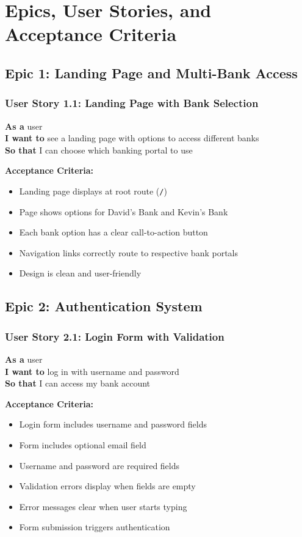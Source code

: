 \documentclass[11pt,a4paper]{article}
\begin{document}
\section{Epics, User Stories, and Acceptance Criteria}

\subsection{Epic 1: Landing Page and Multi-Bank Access}

\subsubsection{User Story 1.1: Landing Page with Bank Selection}
\textbf{As a} user\\
\textbf{I want to} see a landing page with options to access different banks\\
\textbf{So that} I can choose which banking portal to use

\textbf{Acceptance Criteria:}
\begin{itemize}[leftmargin=*]
    \item Landing page displays at root route (\texttt{/})
    \item Page shows options for David's Bank and Kevin's Bank
    \item Each bank option has a clear call-to-action button
    \item Navigation links correctly route to respective bank portals
    \item Design is clean and user-friendly
\end{itemize}

\subsection{Epic 2: Authentication System}

\subsubsection{User Story 2.1: Login Form with Validation}
\textbf{As a} user\\
\textbf{I want to} log in with username and password\\
\textbf{So that} I can access my bank account

\textbf{Acceptance Criteria:}
\begin{itemize}[leftmargin=*]
    \item Login form includes username and password fields
    \item Form includes optional email field
    \item Username and password are required fields
    \item Validation errors display when fields are empty
    \item Error messages clear when user starts typing
    \item Form submission triggers authentication
\end{itemize}
\end{document}
